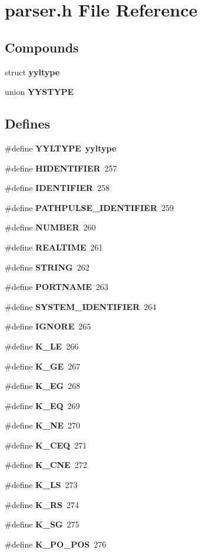 \section{parser.h File Reference}
\label{parser_8h}
\subsection*{Compounds}
\begin{CompactItemize}
\item 
struct {\bf yyltype}
\item 
union {\bf YYSTYPE}
\end{CompactItemize}
\subsection*{Defines}
\begin{CompactItemize}
\item 
\#define {\bf YYLTYPE}\ {\bf yyltype}
\item 
\#define {\bf HIDENTIFIER}\ 257
\item 
\#define {\bf IDENTIFIER}\ 258
\item 
\#define {\bf PATHPULSE\_\-IDENTIFIER}\ 259
\item 
\#define {\bf NUMBER}\ 260
\item 
\#define {\bf REALTIME}\ 261
\item 
\#define {\bf STRING}\ 262
\item 
\#define {\bf PORTNAME}\ 263
\item 
\#define {\bf SYSTEM\_\-IDENTIFIER}\ 264
\item 
\#define {\bf IGNORE}\ 265
\item 
\#define {\bf K\_\-LE}\ 266
\item 
\#define {\bf K\_\-GE}\ 267
\item 
\#define {\bf K\_\-EG}\ 268
\item 
\#define {\bf K\_\-EQ}\ 269
\item 
\#define {\bf K\_\-NE}\ 270
\item 
\#define {\bf K\_\-CEQ}\ 271
\item 
\#define {\bf K\_\-CNE}\ 272
\item 
\#define {\bf K\_\-LS}\ 273
\item 
\#define {\bf K\_\-RS}\ 274
\item 
\#define {\bf K\_\-SG}\ 275
\item 
\#define {\bf K\_\-PO\_\-POS}\ 276
\item 

\end{CompactItemize}
